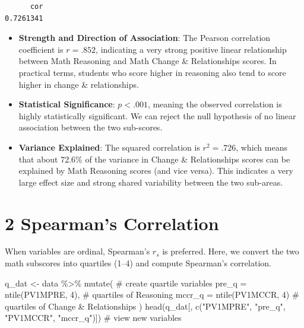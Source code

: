\documentclass[
  letterpaper,
  DIV=11,
  numbers=noendperiod]{scrreprt}
\newenvironment{Shaded}{\begin{snugshade}}{\end{snugshade}}
\newcommand{\AttributeTok}[1]{\textcolor[rgb]{0.40,0.45,0.13}{#1}}
\newcommand{\CommentTok}[1]{\textcolor[rgb]{0.37,0.37,0.37}{#1}}
\newcommand{\DecValTok}[1]{\textcolor[rgb]{0.68,0.00,0.00}{#1}}
\newcommand{\FunctionTok}[1]{\textcolor[rgb]{0.28,0.35,0.67}{#1}}
\newcommand{\NormalTok}[1]{\textcolor[rgb]{0.00,0.23,0.31}{#1}}
\newcommand{\OtherTok}[1]{\textcolor[rgb]{0.00,0.23,0.31}{#1}}
\newcommand{\SpecialCharTok}[1]{\textcolor[rgb]{0.37,0.37,0.37}{#1}}
\newcommand{\StringTok}[1]{\textcolor[rgb]{0.13,0.47,0.30}{#1}}
\begin{document}
\begin{Shaded}
\end{Shaded}

\begin{verbatim}
      cor 
0.7261341 
\end{verbatim}

\begin{itemize}
\item
  \textbf{Strength and Direction of Association}: The Pearson
  correlation coefficient is \(r=.852\), indicating a very strong
  positive linear relationship between Math Reasoning and Math Change \&
  Relationships scores. In practical terms, students who score higher in
  reasoning also tend to score higher in change \& relationships.
\item
  \textbf{Statistical Significance}: \(p<.001\), meaning the observed
  correlation is highly statistically significant. We can reject the
  null hypothesis of no linear association between the two sub-scores.
\item
  \textbf{Variance Explained}: The squared correlation is \(r^2=.726\),
  which means that about 72.6\% of the variance in Change \&
  Relationships scores can be explained by Math Reasoning scores (and
  vice versa). This indicates a very large effect size and strong shared
  variability between the two sub-areas.
\end{itemize}

\section*{2 Spearman's Correlation}\label{spearmans-correlation}


When variables are ordinal, Spearman's \(r_s\) is preferred. Here, we
convert the two math subscores into quartiles (1--4) and compute
Spearman's correlation.

\begin{Shaded}
\begin{Highlighting}[]
\NormalTok{q\_dat }\OtherTok{\textless{}{-}}\NormalTok{ data }\SpecialCharTok{\%\textgreater{}\%} 
  \FunctionTok{mutate}\NormalTok{( }\CommentTok{\# create quartile variables }
    \AttributeTok{pre\_q  =} \FunctionTok{ntile}\NormalTok{(PV1MPRE, }\DecValTok{4}\NormalTok{), }\CommentTok{\# quartiles of Reasoning }
    \AttributeTok{mccr\_q =} \FunctionTok{ntile}\NormalTok{(PV1MCCR, }\DecValTok{4}\NormalTok{)  }\CommentTok{\# quartiles of Change \& Relationships }
\NormalTok{  ) }
\FunctionTok{head}\NormalTok{(q\_dat[, }\FunctionTok{c}\NormalTok{(}\StringTok{"PV1MPRE"}\NormalTok{, }\StringTok{"pre\_q"}\NormalTok{, }\StringTok{"PV1MCCR"}\NormalTok{, }\StringTok{"mccr\_q"}\NormalTok{)]) }\CommentTok{\# view new variables }
\end{Highlighting}
\end{Shaded}
\end{document}
